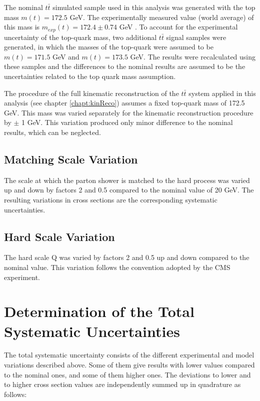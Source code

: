 The nominal $t\bar{t}$ simulated sample used in this analysis was generated with the top mass $m(t) = 172.5$ GeV. The experimentally measured
value (world average) of this mass is $m_{exp}(t) = 172.4 \pm 0.74$ GeV \cite{ATLAS:2014wva}. To account for the experimental uncertainty of the top-quark
mass, two additional $t\bar{t}$ signal samples were generated, in which the masses of the top-quark were assumed to be $m(t) = 171.5$ GeV and
$m(t) = 173.5$ GeV. The results were recalculated using these samples and the differences to the nominal results are assumed to
be the uncertainties related to the top quark mass assumption.

The procedure of the full kinematic reconstruction of the $t\bar{t}$ system applied in this analysis (see chapter \ref{chapt:kinReco})
assumes a fixed top-quark mass of 172.5 GeV. This mass was varied separately for the kinematic reconstruction procedure by $\pm$ 1 GeV. 
This variation produced only minor difference to the nominal results, which can be neglected.

\subsection{Matching Scale Variation}\label{ssec:matchS_sys}

The scale at which the parton shower is matched to the hard process was varied up and down by factors 2 and 0.5 compared to the nominal
value of 20 GeV. The resulting variations in cross sections are the corresponding systematic uncertainties.

\subsection{Hard Scale Variation}\label{ssec:hardS_sys}

The hard scale Q was varied by factors
2 and 0.5 up and down compared to the nominal value. This variation follows the convention 
adopted by the CMS experiment.

\section{Determination of the Total Systematic Uncertainties}\label{sec:syst_det}

The total systematic uncertainty consists of the different experimental and model variations described above.
Some of them give results with lower values compared to the nominal ones, and some of them higher ones.
The deviations to lower and to higher cross section values are independently summed up in quadrature as follows:

